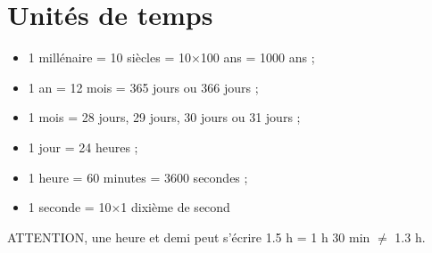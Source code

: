 \section{Unités de temps}
   \begin{changemargin}{-5mm}{-20mm}
        \begin{myvocabulaire}
            \begin{multicols}{2}
                \begin{itemize}
                \item 1 millénaire = 10 siècles = 10$\times$100 ans = \num{1000} ans ; 
                \item 1 an = 12 mois = 365 jours ou 366 jours ;
                \item 1 mois =  28 jours, 29 jours, 30 jours ou 31 jours ;
                \item 1 jour = 24 heures ;
                \item 1 heure = 60 minutes = \num{3600} secondes ;
                \item 1 seconde = 10$\times$1 dixième de second
                \end{itemize}
            \end{multicols}
        \end{myvocabulaire}
    \end{changemargin}
    \vspace*{-10mm}
    \begin{remarque}
        ATTENTION, une heure et demi  peut s'écrire \num{1.5} h = 1 h 30 min $\neq$ \num{1.3} h.
    \end{remarque}
    \vspace*{-10mm}